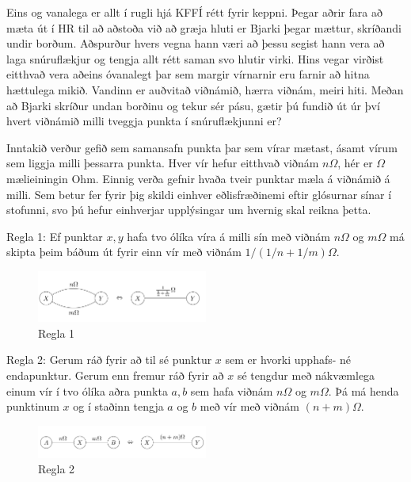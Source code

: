 
Eins og vanalega er allt í rugli hjá KFFÍ rétt fyrir keppni. Þegar aðrir fara að mæta út í HR til að aðstoða við að græja hluti er Bjarki þegar mættur, skríðandi undir borðum.
Aðspurður hvers vegna hann væri að þessu segist hann vera að laga snúruflækjur og tengja allt rétt saman svo hlutir virki. Hins vegar virðist eitthvað vera aðeins óvanalegt þar
sem margir vírnarnir eru farnir að hitna hættulega mikið. Vandinn er auðvitað viðnámið, hærra viðnám, meiri hiti. Meðan að Bjarki skríður undan borðinu og tekur sér pásu, gætir
þú fundið út úr því hvert viðnámið milli tveggja punkta í snúruflækjunni er?

Inntakið verður gefið sem samansafn punkta þar sem vírar mætast, ásamt vírum sem liggja milli þessarra punkta. Hver vír hefur eitthvað viðnám $n \Omega$, hér er $\Omega$ mælieiningin
Ohm. Einnig verða gefnir hvaða tveir punktar mæla á viðnámið á milli. Sem betur fer fyrir þig skildi einhver eðlisfræðinemi eftir glósurnar sínar í stofunni, svo þú hefur einhverjar
upplýsingar um hvernig skal reikna þetta.

Regla 1: Ef punktar $x, y$ hafa tvo ólíka víra á milli sín með viðnám $n \Omega$ og $m \Omega$ má skipta þeim báðum út fyrir einn vír með viðnám $1/(1/n+1/m) \Omega$.

\begin{figure}[h!]
  \centering
    \includegraphics[width=0.5\textwidth]{regla1}
  \caption{Regla 1}
\end{figure}

Regla 2: Gerum ráð fyrir að til sé punktur $x$ sem er hvorki upphafs- né endapunktur. Gerum enn fremur ráð fyrir að $x$ sé tengdur með nákvæmlega einum vír í tvo ólíka aðra punkta $a, b$ sem hafa viðnám
$n \Omega$ og $m \Omega$. Þá má henda punktinum $x$ og í staðinn tengja $a$ og $b$ með vír með viðnám $(n + m)\Omega$. 

\begin{figure}[h!]
  \centering
    \includegraphics[width=0.5\textwidth]{regla2}
  \caption{Regla 2}
\end{figure}


